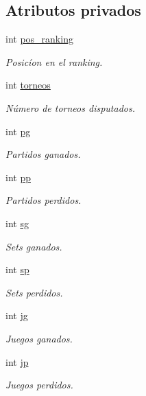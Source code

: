 \subsection*{Atributos privados}
\begin{DoxyCompactItemize}
\item 
int \hyperlink{class_jugador_a200ee7c036d98654af6fab08b8b909e9}{pos\+\_\+ranking}
\begin{DoxyCompactList}\small\item\em Posicíon en el ranking. \end{DoxyCompactList}\item 
int \hyperlink{class_jugador_a2c4256c69ddf76e1c4f1e48f56ed305c}{torneos}
\begin{DoxyCompactList}\small\item\em Número de torneos disputados. \end{DoxyCompactList}\item 
int \hyperlink{class_jugador_ab254a72417747985ffaf53b0508e5e31}{pg}
\begin{DoxyCompactList}\small\item\em Partidos ganados. \end{DoxyCompactList}\item 
int \hyperlink{class_jugador_a90af14828909d3c5cd3fb4a285e96daf}{pp}
\begin{DoxyCompactList}\small\item\em Partidos perdidos. \end{DoxyCompactList}\item 
int \hyperlink{class_jugador_a678970fa93782e3e68f939c37fff5030}{sg}
\begin{DoxyCompactList}\small\item\em Sets ganados. \end{DoxyCompactList}\item 
int \hyperlink{class_jugador_a5bed10a21acb0c437828df282050b2ab}{sp}
\begin{DoxyCompactList}\small\item\em Sets perdidos. \end{DoxyCompactList}\item 
int \hyperlink{class_jugador_a53ac73c3dc720ca6e66406b309077472}{jg}
\begin{DoxyCompactList}\small\item\em Juegos ganados. \end{DoxyCompactList}\item 
int \hyperlink{class_jugador_a306eb04292a1aa300a39c2464c1368fd}{jp}
\begin{DoxyCompactList}\small\item\em Juegos perdidos. \end{DoxyCompactList}\end{DoxyCompactItemize}


